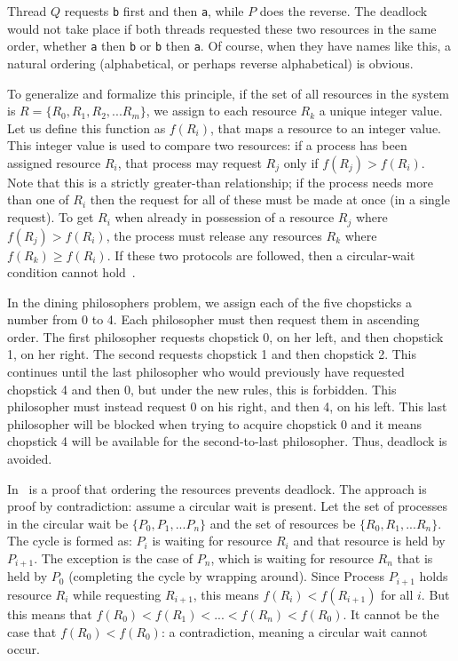 Thread $Q$ requests \texttt{b} first and then \texttt{a}, while $P$ does the reverse. The deadlock would not take place if both threads requested these two resources in the same order, whether \texttt{a} then \texttt{b} or \texttt{b} then \texttt{a}. Of course, when they have names like this, a natural ordering (alphabetical, or perhaps reverse alphabetical) is obvious.

To generalize and formalize this principle, if the set of all resources in the system is $R = \{R_{0}, R_{1}, R_{2}, ... R_{m}\}$, we assign to each resource $R_{k}$ a unique integer value. Let us define this function as $f(R_{i})$, that maps a resource to an integer value. This integer value is used to compare two resources: if a process has been assigned resource $R_{i}$, that process may request $R_{j}$ only if $f(R_{j}) > f(R_{i})$. Note that this is a strictly greater-than relationship; if the process needs more than one of $R_{i}$ then the request for all of these must be made at once (in a single request). To get $R_{i}$ when already in possession of a resource $R_{j}$ where $f(R_{j}) > f(R_{i})$, the process must release any resources $R_{k}$ where $f(R_{k}) \geq f(R_{i})$. If these two protocols are followed, then a circular-wait condition cannot hold~\cite{osc}.

In the dining philosophers problem, we assign each of the five chopsticks a number from 0 to 4. Each philosopher must then request them in ascending order. The first philosopher requests chopstick 0, on her left, and then chopstick 1, on her right. The second requests chopstick 1 and then chopstick 2. This continues until the last philosopher who would previously have requested chopstick 4 and then 0, but under the new rules, this is forbidden. This philosopher must instead request 0 on his right, and then 4, on his left. This last philosopher will be blocked when trying to acquire chopstick 0 and it means chopstick 4 will be available for the second-to-last philosopher. Thus, deadlock is avoided.

In~\cite{osc} is a proof that ordering the resources prevents deadlock. The approach is proof by contradiction: assume a circular wait is present. Let the set of processes in the circular wait be $\{P_{0}, P_{1}, ... P_{n}\}$ and the set of resources be $\{R_{0}, R_{1}, ... R_{n}\}$. The cycle is formed as: $P_{i}$ is waiting for resource $R_{i}$ and that resource is held by $P_{i+1}$. The exception is the case of $P_{n}$, which is waiting for resource $R_{n}$ that is held by $P_{0}$ (completing the cycle by wrapping around). Since Process $P_{i+1}$ holds resource $R_{i}$ while requesting $R_{i+1}$, this means $f(R_{i}) < f(R_{i+1})$ for all $i$. But this means that $f(R_{0}) < f(R_{1}) < ... < f(R_{n}) < f(R_{0})$. It cannot be the case that $f(R_{0}) < f(R_{0})$: a contradiction, meaning a circular wait cannot occur.

